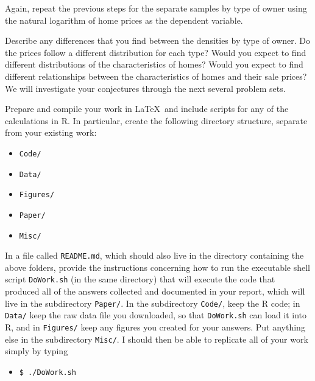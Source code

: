 \documentclass[11pt]{article}
\begin{document}
\medskip
Again, repeat the previous steps
for the separate samples by type of owner using 
the natural logarithm of home prices as the dependent variable.


\medskip
Describe any differences that you find between the densities by type of owner.
Do the prices follow a different distribution for each type?
Would you expect to find different distributions of the characteristics of homes?
Would you expect to find different relationships between the characteristics of homes
and their sale prices?
We will investigate your conjectures through the next several problem sets.






\pagebreak
Prepare and compile your work in \LaTeX\
and include scripts for any of the 
calculations in \textsf{R}.
In particular, create the following directory structure, separate from your
existing work:

\begin{itemize}
\item {\tt Code/}
\item {\tt Data/}
\item {\tt Figures/}
\item {\tt Paper/}
\item {\tt Misc/}
\end{itemize}

\bigskip\noindent
In a file called {\tt README.md}, 
which should also live in the directory
containing the above folders, 
provide the instructions concerning how to run the 
executable shell script {\tt DoWork.sh} (in the same directory) 
that will execute the code that 
produced all of the answers collected and documented in 
your report,
which will live in the subdirectory {\tt Paper/}.
In the subdirectory {\tt Code/}, keep the {\textsf R} code; 
in {\tt Data/} keep the raw data file you downloaded, so that {\tt DoWork.sh} 
can load it into {\textsf R}, 
and in {\tt Figures/} keep any figures you created 
for your answers.
Put anything else in the subdirectory {\tt Misc/}.
I should then be able to replicate all of your work simply by 
typing

\medskip
\begin{itemize}
\item {\tt \$ ./DoWork.sh}
\end{itemize}
\end{document}
